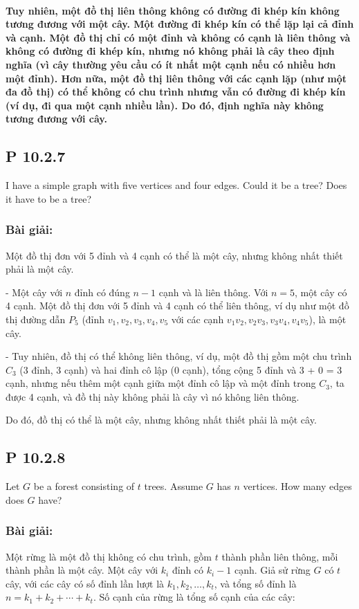 \documentclass[a4paper,12pt]{article}
\begin{document}
\paragraph{Tuy nhiên, một đồ thị liên thông không có đường đi khép kín không tương đương với một cây. Một đường đi khép kín có thể lặp lại cả đỉnh và cạnh. Một đồ thị chỉ có một đỉnh và không có cạnh là liên thông và không có đường đi khép kín, nhưng nó không phải là cây theo định nghĩa (vì cây thường yêu cầu có ít nhất một cạnh nếu có nhiều hơn một đỉnh). Hơn nữa, một đồ thị liên thông với các cạnh lặp (như một đa đồ thị) có thể không có chu trình nhưng vẫn có đường đi khép kín (ví dụ, đi qua một cạnh nhiều lần). Do đó, định nghĩa này không tương đương với cây.}

\subsection*{P 10.2.7}
I have a simple graph with five vertices and four edges. Could it be a tree? Does it have to be a tree?

\subsubsection*{Bài giải:}
Một đồ thị đơn với 5 đỉnh và 4 cạnh có thể là một cây, nhưng không nhất thiết phải là một cây.

- Một cây với \( n \) đỉnh có đúng \( n-1 \) cạnh và là liên thông. Với \( n = 5 \), một cây có 4 cạnh. Một đồ thị đơn với 5 đỉnh và 4 cạnh có thể liên thông, ví dụ như một đồ thị đường dẫn \( P_5 \) (đỉnh \( v_1, v_2, v_3, v_4, v_5 \) với các cạnh \( v_1v_2, v_2v_3, v_3v_4, v_4v_5 \)), là một cây.

- Tuy nhiên, đồ thị có thể không liên thông, ví dụ, một đồ thị gồm một chu trình \( C_3 \) (3 đỉnh, 3 cạnh) và hai đỉnh cô lập (0 cạnh), tổng cộng 5 đỉnh và 3 + 0 = 3 cạnh, nhưng nếu thêm một cạnh giữa một đỉnh cô lập và một đỉnh trong \( C_3 \), ta được 4 cạnh, và đồ thị này không phải là cây vì nó không liên thông.

Do đó, đồ thị có thể là một cây, nhưng không nhất thiết phải là một cây.

\subsection*{P 10.2.8}
Let \( G \) be a forest consisting of \( t \) trees. Assume \( G \) has \( n \) vertices. How many edges does \( G \) have?

\subsubsection*{Bài giải:}
Một rừng là một đồ thị không có chu trình, gồm \( t \) thành phần liên thông, mỗi thành phần là một cây. Một cây với \( k_i \) đỉnh có \( k_i - 1 \) cạnh. Giả sử rừng \( G \) có \( t \) cây, với các cây có số đỉnh lần lượt là \( k_1, k_2, \ldots, k_t \), và tổng số đỉnh là \( n = k_1 + k_2 + \cdots + k_t \). Số cạnh của rừng là tổng số cạnh của các cây:
\end{document}
